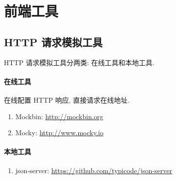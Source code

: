 \section{前端工具}

\subsection{HTTP 请求模拟工具}

HTTP 请求模拟工具分两类: 在线工具和本地工具.

\paragraph{在线工具} 在线配置 HTTP 响应, 直接请求在线地址.
\begin{enumerate}
    \item Mockbin: \url{http://mockbin.org}
    \item Mocky: \url{http://www.mocky.io}
\end{enumerate}

\paragraph{本地工具}
\begin{enumerate}
    \item json-server: \url{https://github.com/typicode/json-server}
\end{enumerate}